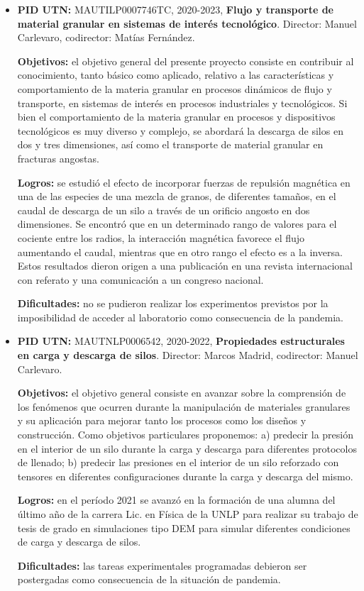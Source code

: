 \documentclass[a4paper,11pt,twoside,final,titlepage,onecolumn,openright]{report}
\begin{document}
\begin{itemize}
 {\bf Dificultades:} La mayor complicación fue el retraso de los experimentos previstos por causa de la pandemia.
 
  
\item {\bf PID UTN:} MAUTILP0007746TC, 2020-2023, {\bf Flujo y transporte de material granular en sistemas de interés tecnológico}. Director: Manuel Carlevaro, codirector: Matías Fernández.
 
{\bf Objetivos:} el objetivo general del presente proyecto consiste en contribuir al conocimiento, tanto básico como aplicado, relativo a las características y comportamiento de la materia granular en procesos dinámicos de flujo y transporte, en sistemas de interés en procesos industriales y tecnológicos. Si bien el comportamiento de la materia granular en procesos y dispositivos tecnológicos es muy diverso y complejo, se abordará la descarga de silos en dos y tres dimensiones, así como el transporte de material granular en fracturas angostas.

 
 {\bf Logros:} se estudió el efecto de incorporar fuerzas de repulsión magnética en una de las especies de una mezcla de granos, de diferentes tamaños, en el caudal de descarga de un silo a través de un orificio angosto en dos dimensiones. Se encontró que en un determinado rango de
 valores para el cociente entre los radios, la interacción magnética favorece el flujo aumentando
 el caudal, mientras que en otro rango el efecto es a la inversa. Estos resultados dieron origen a una publicación en una revista internacional con referato y una comunicación a un congreso nacional.
 
 {\bf Dificultades:} no se pudieron realizar los experimentos previstos por la imposibilidad de acceder al laboratorio como consecuencia de la pandemia.
 
\item {\bf PID UTN:} MAUTNLP0006542, 2020-2022, {\bf Propiedades estructurales en carga y descarga de silos}. Director: Marcos Madrid, codirector: Manuel Carlevaro.
 
{\bf Objetivos:} el objetivo general consiste en avanzar sobre la comprensión de los fenómenos que ocurren durante la manipulación de materiales granulares y su aplicación para mejorar tanto los procesos como los diseños y construcción. Como objetivos particulares proponemos: a) predecir la presión en el interior de un silo durante la carga y descarga para diferentes protocolos de llenado; b) predecir las presiones en el interior de un silo reforzado con tensores en diferentes configuraciones durante la carga y descarga del mismo.

 {\bf Logros:}  en el período 2021 se avanzó en la formación de una alumna del último año de la carrera Lic. en Física de la UNLP para realizar su trabajo de tesis de grado en simulaciones tipo DEM para simular diferentes condiciones de carga y descarga de silos.
 
 {\bf Dificultades:} las tareas experimentales programadas debieron ser postergadas como consecuencia de la situación de pandemia.

\end{itemize}
\end{document}

